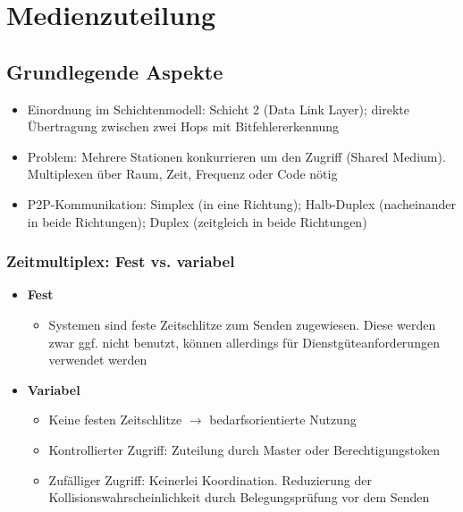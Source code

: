 \section{Medienzuteilung}

\subsection{Grundlegende Aspekte}
\begin{itemize}
	\item Einordnung im Schichtenmodell: Schicht 2 (Data Link Layer); direkte Übertragung zwischen zwei Hops mit Bitfehlererkennung
	\item Problem: Mehrere Stationen konkurrieren um den Zugriff (Shared Medium). Multiplexen über Raum, Zeit, Frequenz oder Code nötig
	\item P2P-Kommunikation: Simplex (in eine Richtung); Halb-Duplex (nacheinander in beide Richtungen); Duplex (zeitgleich in beide Richtungen)
\end{itemize}

\subsubsection{Zeitmultiplex: Fest vs. variabel}
\begin{itemize}
	\item \textbf{Fest}
	\begin{itemize}
		\item Systemen sind feste Zeitschlitze zum Senden zugewiesen. Diese werden zwar ggf. nicht benutzt, können allerdings für Dienstgüteanforderungen verwendet werden
	\end{itemize}
	\item \textbf{Variabel}
	\begin{itemize}
		\item Keine festen Zeitschlitze \(\rightarrow\) bedarfsorientierte Nutzung
		\item Kontrollierter Zugriff: Zuteilung durch Master oder Berechtigungstoken
		\item Zufälliger Zugriff: Keinerlei Koordination. Reduzierung der Kollisionswahrscheinlichkeit durch Belegungsprüfung vor dem Senden
	\end{itemize}
\end{itemize}

